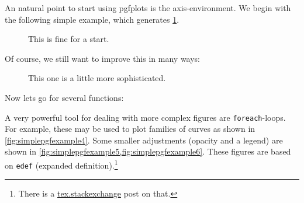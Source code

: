 An natural point to start using pgfplots is the axis-environment. We begin with the following simple example, which generates \cref{fig:simplepgfexample1}.



\begin{figure}[h]
	\centering
	
	\caption{This is fine for a start.}
	\label{fig:simplepgfexample1}
\end{figure}
Of course, we still want to improve this in many ways:

%

\begin{figure}[h]
	\centering
	
	\caption{This one is a little more sophisticated.}
	\label{fig:simplepgfexample2}
\end{figure}

Now lets go for several functions:

%

\begin{figure*}[h]
\centering

\caption{This one is a little more sophisticated.}
\label{fig:simplepgfexample3}
\end{figure*}

A very powerful tool for dealing with more complex figures are \verb|foreach|-loops. For example, these may be used to plot families of curves as shown in \cref{fig:simplepgfexample4}. Some smaller adjustments (opacity and a legend) are shown in \cref{fig:simplepgfexample5,fig:simplepgfexample6}. These figures are based on \verb|edef| (expanded definition).\footnote{There is a \href{https://tex.stackexchange.com/questions/17638/pgfplots-foreach-equivalent-to-tikzs-with-multiple-variables-separated-by-a-sla}{\url{tex.stackexchange}} post on that.}

\begin{figure*}[h]
	\centering
	
	\caption{A family of modulated Gaussian curves.}
	\label{fig:simplepgfexample4}
\end{figure*}

\begin{figure*}[h]
	\centering
	
	\caption{Now using opacity ...}
	\label{fig:simplepgfexample5}
\end{figure*}

